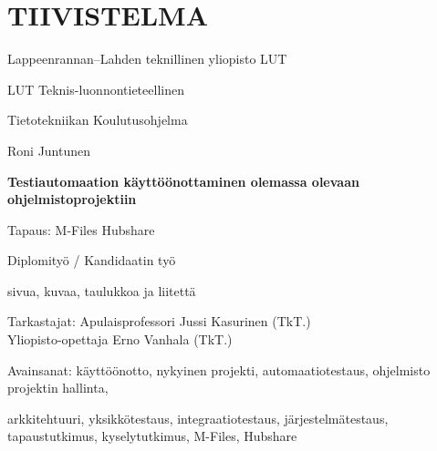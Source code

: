 \chapter*{TIIVISTELMA}

Lappeenrannan–Lahden teknillinen yliopisto LUT

LUT Teknis-luonnontieteellinen

Tietotekniikan Koulutusohjelma

\hspace{1em}

Roni Juntunen

\hspace{1em}

\textbf{Testiautomaation käyttöönottaminen olemassa olevaan ohjelmistoprojektiin}

Tapaus: M-Files Hubshare

\hspace{1em}

Diplomityö / Kandidaatin työ

\the\year{}

 sivua,   kuvaa,  taulukkoa ja  liitettä

\begin{flushleft}
	Tarkastajat:  Apulaisprofessori Jussi Kasurinen (TkT.)\\
	\hspace{20.0mm} Yliopisto-opettaja Erno Vanhala (TkT.)\\
\end{flushleft}

Avainsanat: käyttöönotto, nykyinen projekti, automaatiotestaus, ohjelmisto projektin hallinta,

\vspace{-8pt}
\leftskip=21.0mm arkkitehtuuri, yksikkötestaus, integraatiotestaus, järjestelmätestaus, tapaustutkimus, kyselytutkimus, M-Files, Hubshare\\

\leftskip=0pt

\hspace{1em}


